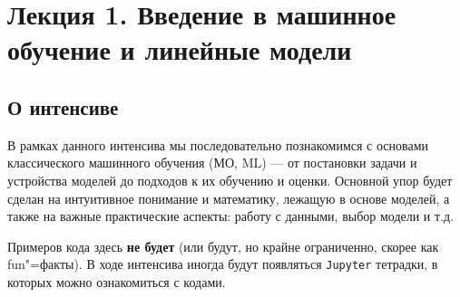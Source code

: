 \section*{Лекция 1. Введение в машинное обучение и линейные модели}

\subsection*{О интенсиве}

В рамках данного интенсива мы последовательно познакомимся с основами классического машинного обучения (МО, ML) — от постановки задачи и устройства моделей до подходов к их обучению и оценки. Основной упор будет сделан на интуитивное понимание и математику, лежащую в основе моделей, а также на важные практические аспекты: работу с данными, выбор модели и т.д.

Примеров кода здесь \textbf{не будет} (или будут, но крайне ограниченно, скорее как fun"=факты). В ходе интенсива иногда будут появляться \texttt{Jupyter} тетрадки, в которых можно ознакомиться с кодами.
